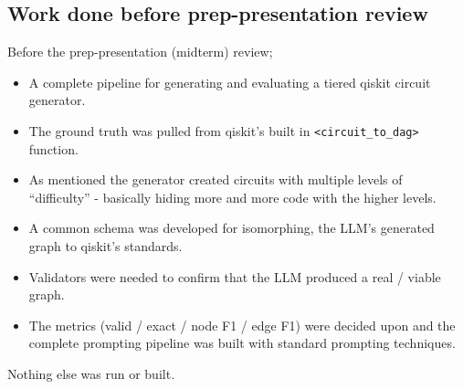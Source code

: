 \documentclass[twoside,english]{article}
\begin{document}
\subsection{Work done before prep-presentation review}
Before the prep-presentation (midterm) review;
\begin{itemize}
	\item A complete pipeline for generating and evaluating a tiered qiskit circuit generator. 
	\item The ground truth was pulled from qiskit's built in \texttt{<circuit\_to\_dag>} function. 
	\item As mentioned the generator created circuits with multiple levels of ``difficulty'' - basically 
hiding more and more code with the higher levels. 
	\item A common schema was developed for isomorphing, the LLM's generated graph to qiskit's standards. 
	\item Validators were needed to confirm that the LLM produced a real / viable graph. 
	\item The metrics (valid / exact / node F1 / edge F1) were decided upon and the complete prompting pipeline was built with standard prompting techniques.
\end{itemize}
 Nothing else was run or built.
\end{document}
